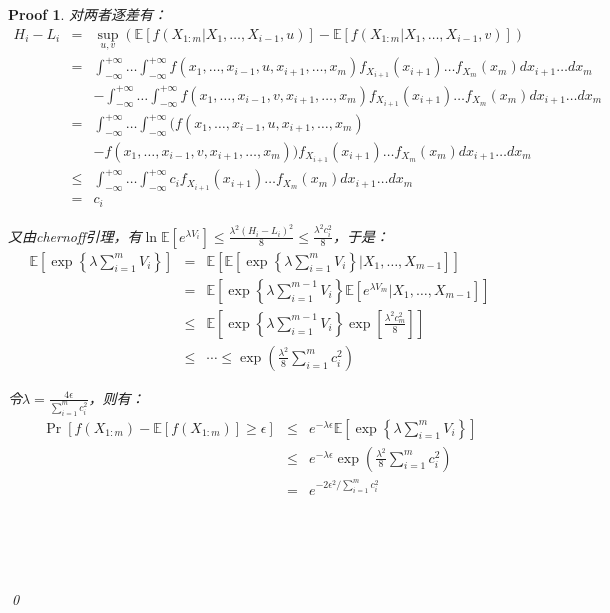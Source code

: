 \documentclass[a4paper,UTF8]{article}
\numberwithin{equation}{section}
\newtheorem*{myProof}{Proof}
\begin{document}
\begin{myProof}
对两者逐差有：
\begin{eqnarray*}
H_i - L_i &=& \sup_{u, v} (\mathbb{E}[f(X_{1:m}|X_1, \ldots, X_{i-1}, u) ] - \mathbb{E}[f(X_{1:m}|X_1, \ldots, X_{i-1}, v) ]) \\
&=& \int_{-\infty}^{+\infty}\ldots\int_{-\infty}^{+\infty} f(x_1, \ldots, x_{i-1}, u, x_{i+1}, \ldots, x_m) f_{X_{i+1}}(x_{i+1}) \ldots f_{X_{m}}(x_m) d x_{i+1} \ldots d x_m \\
&& - \int_{-\infty}^{+\infty}\ldots\int_{-\infty}^{+\infty} f(x_1, \ldots, x_{i-1}, v, x_{i+1}, \ldots, x_m) f_{X_{i+1}}(x_{i+1}) \ldots f_{X_{m}}(x_m) d x_{i+1} \ldots d x_m \\
&=& \int_{-\infty}^{+\infty}\ldots\int_{-\infty}^{+\infty} (f(x_1, \ldots, x_{i-1}, u, x_{i+1}, \ldots, x_m) \\
&& - f(x_1, \ldots, x_{i-1}, v, x_{i+1}, \ldots, x_m) ) f_{X_{i+1}}(x_{i+1}) \ldots f_{X_{m}}(x_m) d x_{i+1} \ldots d x_m \\
&\le& \int_{-\infty}^{+\infty}\ldots\int_{-\infty}^{+\infty} c_i f_{X_{i+1}}(x_{i+1}) \ldots f_{X_{m}}(x_m) d x_{i+1} \ldots d x_m \\
&=& c_i
\end{eqnarray*}

又由chernoff引理，有$\ln \mathbb{E}[e^{\lambda V_i}] \le \frac{\lambda^2(H_i - L_i)^2}{8} \le \frac{\lambda^2c_i^2}{8}$，于是：
\begin{eqnarray*}
\mathbb{E}\left[ \exp\left\{\lambda\sum_{i=1}^m V_i\right\} \right] &=& \mathbb{E} \left[ \mathbb{E}\left[ \exp\left\{\lambda\sum_{i=1}^m V_i\right\} | X_1, \ldots, X_{m-1} \right] \right] \\
&=& \mathbb{E} \left[ \exp\left\{\lambda\sum_{i=1}^{m-1} V_i\right\} \mathbb{E}\left[ e^{\lambda V_m} | X_1, \ldots, X_{m-1} \right] \right] \\
&\le& \mathbb{E} \left[ \exp\left\{\lambda\sum_{i=1}^{m-1} V_i\right\} \exp [ \frac{\lambda^2c_m^2}{8} ] \right] \\
&\le& \cdots \le \exp ( \frac{\lambda^2}{8} \sum_{i=1}^m c_i^2 )
\end{eqnarray*}

令$\lambda = \frac{4\epsilon}{\sum_{i=1}^{m} c_i^2}$，则有：
\begin{eqnarray*}
\Pr[f(X_{1:m})-\mathbb{E}[f(X_{1:m})] \geq \epsilon] &\le& e^{-\lambda \epsilon} \mathbb{E}\left[ \exp\left\{\lambda\sum_{i=1}^m V_i\right\} \right] \\
&\le& e^{-\lambda \epsilon} \exp ( \frac{\lambda^2}{8} \sum_{i=1}^m c_i^2 ) \\
&=& e^{-2\epsilon^2/\sum_{i=1}^mc_i^2}
\end{eqnarray*}

	~\\
	~\\
	~\\
	~\\
	\qed
	\end{myProof}
\end{document}
